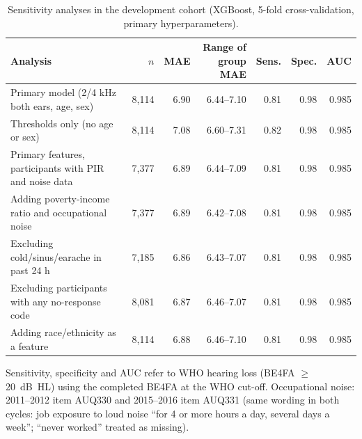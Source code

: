 \begin{table}[p]
\centering
\caption{Sensitivity analyses in the development cohort (XGBoost, 5-fold cross-validation, primary hyperparameters).}
\label{tab:sens}
\scriptsize
\begin{tabular}{p{6cm} rrrrrr}
\toprule
Analysis & $n$ & MAE & Range of group MAE & Sens. & Spec. & AUC \\
\midrule
Primary model (2/4 kHz both ears, age, sex) & 8,114 & 6.90 & 6.44--7.10 & 0.81 & 0.98 & 0.985 \\
Thresholds only (no age or sex) & 8,114 & 7.08 & 6.60--7.31 & 0.82 & 0.98 & 0.985 \\
Primary features, participants with PIR and noise data & 7,377 & 6.89 & 6.44--7.09 & 0.81 & 0.98 & 0.985 \\
Adding poverty-income ratio and occupational noise & 7,377 & 6.89 & 6.42--7.08 & 0.81 & 0.98 & 0.985 \\
Excluding cold/sinus/earache in past 24 h & 7,185 & 6.86 & 6.43--7.07 & 0.81 & 0.98 & 0.985 \\
Excluding participants with any no-response code & 8,081 & 6.87 & 6.46--7.07 & 0.81 & 0.98 & 0.985 \\
Adding race/ethnicity as a feature & 8,114 & 6.88 & 6.46--7.10 & 0.81 & 0.98 & 0.985 \\
\bottomrule
\end{tabular}
\par\smallskip\raggedright
Sensitivity, specificity and AUC refer to WHO hearing loss (BE4FA $\geq$20~dB~HL) using the completed BE4FA at the WHO cut-off. Occupational noise: 2011--2012 item AUQ330 and 2015--2016 item AUQ331 (same wording in both cycles: job exposure to loud noise ``for 4 or more hours a day, several days a week''; ``never worked'' treated as missing).
\end{table}
